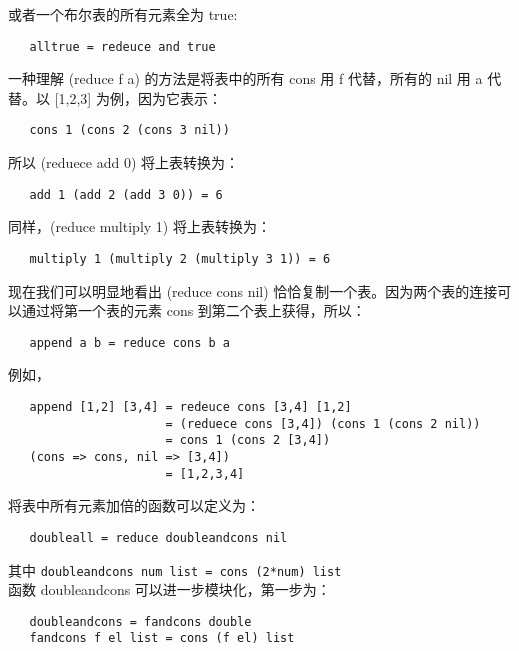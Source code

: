 \documentclass[12pt,a4paper]{article}
\begin{document}
或者一个布尔表的所有元素全为 true:

\begin{verbatim}
   alltrue = redeuce and true
\end{verbatim}

一种理解 (reduce f a) 的方法是将表中的所有 cons 用 f 代替，所有的 nil 用 a 代替。以 [1,2,3] 为例，因为它表示：

\begin{verbatim}
   cons 1 (cons 2 (cons 3 nil))
\end{verbatim}

所以 (reduece add 0) 将上表转换为：

\begin{verbatim}
   add 1 (add 2 (add 3 0)) = 6
\end{verbatim}

同样，(reduce multiply 1) 将上表转换为：

\begin{verbatim}
   multiply 1 (multiply 2 (multiply 3 1)) = 6
\end{verbatim}

现在我们可以明显地看出 (reduce cons nil) 恰恰复制一个表。因为两个表的连接可以通过将第一个表的元素 cons 到第二个表上获得，所以：

\begin{verbatim}
   append a b = reduce cons b a
\end{verbatim}

例如，
\begin{verbatim}
   append [1,2] [3,4] = redeuce cons [3,4] [1,2]
                      = (reduece cons [3,4]) (cons 1 (cons 2 nil))
                      = cons 1 (cons 2 [3,4])
   (cons => cons, nil => [3,4])
                      = [1,2,3,4]
\end{verbatim}

将表中所有元素加倍的函数可以定义为：

\begin{verbatim}
   doubleall = reduce doubleandcons nil
\end{verbatim}

其中 \verb"doubleandcons num list = cons (2*num) list"\\

函数 doubleandcons 可以进一步模块化，第一步为：

\begin{verbatim}
   doubleandcons = fandcons double
   fandcons f el list = cons (f el) list
\end{verbatim}
\end{document}
